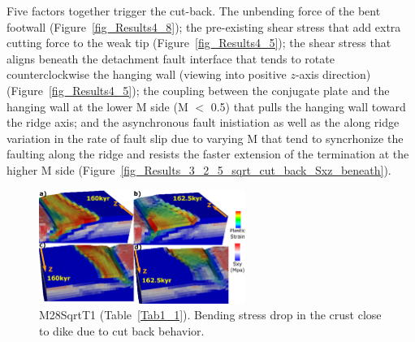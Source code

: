 Five factors together trigger the cut-back. The unbending force of the bent footwall (Figure~\hyperref[fig_Results4_8]{\ref{fig_Results4_8}}); the pre-existing shear stress that add extra cutting force to the weak tip (Figure~\hyperref[fig_Results4_5]{\ref{fig_Results4_5}}); the shear stress that aligns beneath the detachment fault interface that tends to rotate counterclockwise the hanging wall (viewing into positive $z$-axis direction) (Figure~\hyperref[fig_Results4_5]{\ref{fig_Results4_5}}); the coupling between the conjugate plate and the hanging wall at the lower M side (M $<$ 0.5) that pulls the hanging wall toward the ridge axis; and the asynchronous fault inistiation as well as the along ridge variation in the rate of fault slip due to varying M that tend to syncrhonize the faulting along the ridge and resists the faster extension of the termination at the higher M side (Figure~\hyperref[fig_Results_3_2_5_sqrt_cut_back_Sxz_beneath]{\ref{fig_Results_3_2_5_sqrt_cut_back_Sxz_beneath}}).


\begin{figure}[h]
  \centering
    \includegraphics[width=0.6\textwidth]{./Figures/fig_Results4_6_sqrt_cut_back_bending_drop.eps}
  \caption{M28SqrtT1 (Table~\hyperref[Tab1_1]{\ref{Tab1_1}}). Bending stress drop in the crust close to dike due to cut back behavior.}
 \label{fig_Results4_6}
\end{figure}

